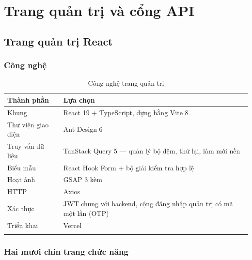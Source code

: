 \chapter{Trang quản trị và cổng API}

\section{Trang quản trị React}

\subsection{Công nghệ}

\begin{longtable}{L{4.4cm} L{9.2cm}}
\toprule
\textbf{Thành phần} & \textbf{Lựa chọn}\\
\midrule
\endhead
Khung & React 19 + TypeScript, dựng bằng Vite 8\\
Thư viện giao diện & Ant Design 6\\
Truy vấn dữ liệu & TanStack Query 5 — quản lý bộ đệm, thử lại, làm mới nền\\
Biểu mẫu & React Hook Form + bộ giải kiểm tra hợp lệ\\
Hoạt ảnh & GSAP 3 kèm \\
HTTP & Axios\\
Xác thực & JWT chung với backend, cộng đăng nhập quản trị có mã một lần (OTP)\\
Triển khai & Vercel\\
\bottomrule
\caption{Công nghệ trang quản trị}
\end{longtable}

\subsection{Hai mươi chín trang chức năng}

